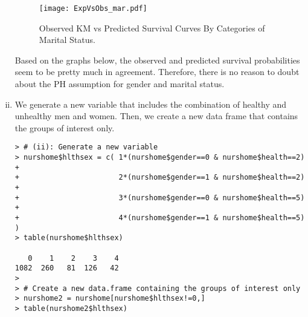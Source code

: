 \begin{enumerate}[(i)]
\begin{figure}[htbp]
	\centering
		\texttt{[image: ExpVsObs\_mar.pdf]}
	\caption{Observed KM vs Predicted Survival Curves By Categories of Marital Status.}
	\label{figure4}
\end{figure}
Based on the graphs below, the observed and predicted survival probabilities seem to be pretty much in agreement. Therefore, there is no reason to doubt about the PH assumption for gender and marital status. 
\newpage
\item We generate a new variable that includes the combination of healthy and unhealthy men and women. Then, we create a new data frame that contains the groups of interest only.
\begin{spacing}{1.2}
\begin{footnotesize}
\begin{verbatim}
> # (ii): Generate a new variable
> nurshome$hlthsex = c( 1*(nurshome$gender==0 & nurshome$health==2) + 
+                       2*(nurshome$gender==1 & nurshome$health==2) +
+                       3*(nurshome$gender==0 & nurshome$health==5) +
+                       4*(nurshome$gender==1 & nurshome$health==5) )  
> table(nurshome$hlthsex)

   0    1    2    3    4 
1082  260   81  126   42 
> 
> # Create a new data.frame containing the groups of interest only
> nurshome2 = nurshome[nurshome$hlthsex!=0,]
> table(nurshome2$hlthsex)


\end{verbatim}
\end{footnotesize}
\end{spacing}
\end{enumerate}
